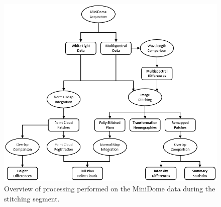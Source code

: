\begin{figure}[ht]
	\centering
	\includegraphics[width=1\textwidth]{img/StitchingDataProcessingWorkflow.png}
	\caption{Overview of processing performed on the MiniDome data during the stitching segment.}
	\label{fig:StitchingWorkflow}
\end{figure}
	







